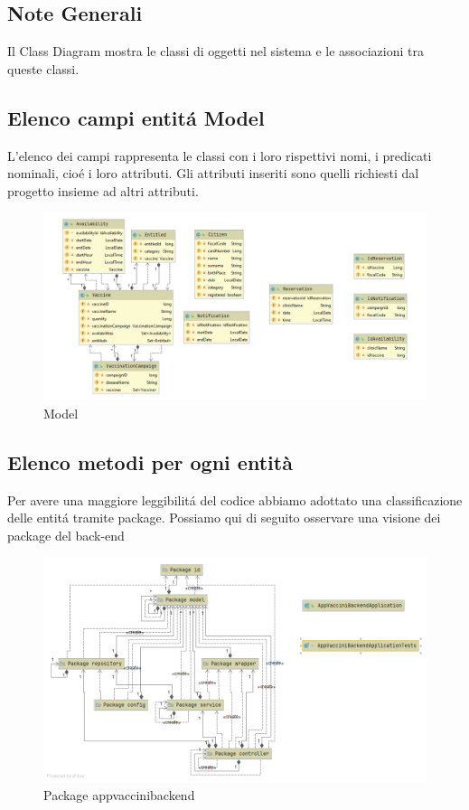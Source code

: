 \documentclass[a4paper,12pt,openany,oneside]{book}
\begin{document}
\subsection*{Note Generali}
Il Class Diagram mostra le classi di oggetti nel sistema e le associazioni tra queste classi.
\subsection{Elenco campi entitá Model}
L’elenco dei campi rappresenta le classi con i loro rispettivi nomi, i predicati nominali, cioé i loro attributi. Gli attributi inseriti sono quelli richiesti dal progetto insieme ad altri attributi.
\begin{figure}[h] 
\centering
\includegraphics[width=0.9\columnwidth]{Package model.png} 
\caption{Model} 
\end{figure}
\subsection{Elenco metodi per ogni entità}
Per avere una maggiore leggibilitá del codice abbiamo adottato una classificazione delle entitá tramite package. Possiamo qui di seguito osservare una visione dei package del back-end
\begin{figure}[h] 
\centering
\includegraphics[width=0.8\columnwidth]{Package appvaccinibackend.png} 
\caption{Package appvaccinibackend} 
\end{figure}
\end{document}

